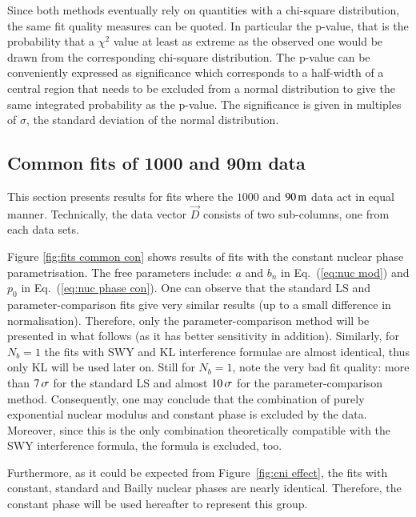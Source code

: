 
Since both methods eventually rely on quantities with a chi-square distribution, the same fit quality measures can be quoted. In particular the p-value, that is the probability that a $\chi^2$ value at least as extreme as the observed one would be drawn from the corresponding chi-square distribution. The p-value can be conveniently expressed as significance which corresponds to a half-width of a central region that needs to be excluded from a normal distribution to give the same integrated probability as the p-value. The significance is given in multiples of $\sigma$, the standard deviation of the normal distribution.



\subsection{Common fits of 1000 and 90m data}
\label{sec:cni common fits}

This section presents results for fits where the $1000$ and $90\,{\rm m}$ data act in equal manner. Technically, the data vector $\vec D$ consists of two sub-columns, one from each data sets.

Figure \ref{fig:fits common con} shows results of fits with the constant nuclear phase parametrisation. The free parameters include: $a$ and $b_n$ in Eq.~(\ref{eq:nuc mod}) and $p_0$ in Eq.~(\ref{eq:nuc phase con}). One can observe that the standard LS and parameter-comparison fits give very similar results (up to a small difference in normalisation). Therefore, only the parameter-comparison method will be presented in what follows (as it has better sensitivity in addition). Similarly, for $N_b = 1$ the fits with SWY and KL interference formulae are almost identical, thus only KL will be used later on. Still for $N_b = 1$, note the very bad fit quality: more than $7\,{\rm \sigma}$ for the standard LS and almost $10\,{\rm \sigma}$ for the parameter-comparison method. Consequently, one may conclude that the combination of purely exponential nuclear modulus and constant phase is excluded by the data. Moreover, since this is the only combination theoretically compatible with the SWY interference formula, the formula is excluded, too.

Furthermore, as it could be expected from Figure~\ref{fig:cni effect}, the fits with constant, standard and Bailly nuclear phases are nearly identical. Therefore, the constant phase will be used hereafter to represent this group.

